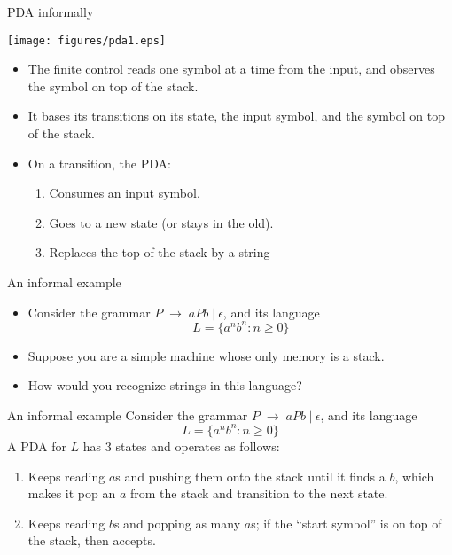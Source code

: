 \documentclass{prosper}%
\newcommand{\e} {{\mbox{$\epsilon$}}}
\newcommand{\ra}{\mbox{$\;\rightarrow\;$}}
\newcommand{\vb}{\mbox{$\;|\:$}}
\begin{document}
\begin{slide}{PDA informally}
\begin{center}
\texttt{[image: figures/pda1.eps]}
\end{center}
\begin{itemize}
\item The finite control reads one symbol at a time from the input, and observes the symbol on top of the stack.
\item It bases its transitions on {\blue its state}, {\blue the input symbol}, and {\blue the symbol on top of the stack}.
\item On a transition, the PDA:
\begin{enumerate}
\item Consumes an input symbol. 
\item Goes to a new state (or stays in the old). 
\item Replaces the top of the stack by a string
\end{enumerate}
\end{itemize}
\end{slide}

\begin{slide}{An informal example}
\begin{itemize}
\item Consider the grammar $P\ra aPb\vb \e$, and its language \[
L=\{a^nb^n:n\geq 0\}\] 

\item Suppose you are a simple machine whose only memory is a stack.

\item How would you recognize strings in this language?
\end{itemize}

\end{slide}

\begin{slide}
{An informal example}
Consider the grammar $P\ra aPb\vb \e$, and its language \[
L=\{a^nb^n:n\geq 0\}\] 
A PDA for $L$ has 3 states and operates as follows:
\begin{enumerate}
\item Keeps reading $a$s and pushing them onto the stack until it finds a $b$, which makes it pop an $a$ from the stack and transition to the next state.
\item Keeps reading $b$s and popping as many $a$s; if the ``start symbol''  is on top of the stack, then accepts.
\end{enumerate}
\end{slide}
\end{document}
